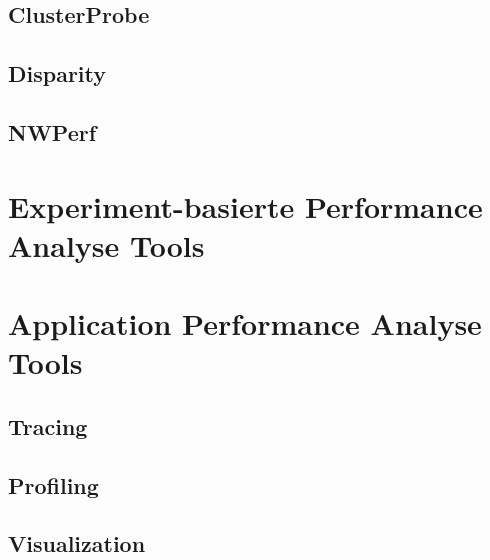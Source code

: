 \subsection{ClusterProbe}

\subsection{Disparity}

\subsection{NWPerf}



\section{Experiment-basierte Performance Analyse Tools}

\section{Application Performance Analyse Tools}

\subsection{Tracing}

\subsection{Profiling}

\subsection{Visualization}
